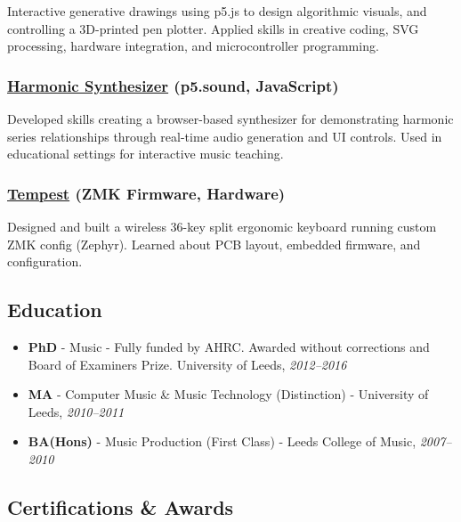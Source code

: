 \documentclass[10pt,a4paper]{article}
\providecommand{\tightlist}{%
  \setlength{\itemsep}{0pt}\setlength{\parskip}{0pt}}
\begin{document}
Interactive generative drawings using p5.js to design algorithmic
visuals, and controlling a 3D-printed pen plotter. Applied skills in
creative coding, SVG processing, hardware integration, and
microcontroller programming.

\subsubsection{\texorpdfstring{\href{https://github.com/thrly/harmonic-series-synth}{Harmonic
Synthesizer} (p5.sound,
JavaScript)}{Harmonic Synthesizer (p5.sound, JavaScript)}}\label{harmonic-synthesizer-p5.sound-javascript}

Developed skills creating a browser-based synthesizer for demonstrating
harmonic series relationships through real-time audio generation and UI
controls. Used in educational settings for interactive music teaching.

\subsubsection{\texorpdfstring{\href{https://github.com/thrly/tempest}{Tempest}
(ZMK Firmware,
Hardware)}{Tempest (ZMK Firmware, Hardware)}}\label{tempest-zmk-firmware-hardware}

Designed and built a wireless 36-key split ergonomic keyboard running
custom ZMK config (Zephyr). Learned about PCB layout, embedded firmware,
and configuration.

\subsection{Education}\label{education}

\begin{itemize}
\tightlist
\item
  \textbf{PhD} - Music - Fully funded by AHRC. Awarded without
  corrections and Board of Examiners Prize. University of Leeds,
  \emph{2012--2016}
\item
  \textbf{MA} - Computer Music \& Music Technology (Distinction) -
  University of Leeds, \emph{2010--2011}
\item
  \textbf{BA(Hons)} - Music Production (First Class) - Leeds College of
  Music, \emph{2007--2010}
\end{itemize}

\subsection{Certifications \& Awards}\label{certifications-awards}
\end{document}
